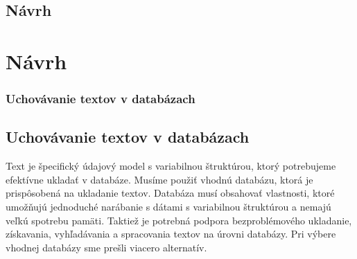 \newpage
%
%
{
	\section{Návrh}
}
{
	\chapter{Návrh}
}
\label{section:design}

%
%
{
	\subsection{Uchovávanie textov v databázach}
}
{
	\section{Uchovávanie textov v databázach}
}
\label{subsection:persisting_texts_in_db}
Text je špecifický údajový model s variabilnou štruktúrou, ktorý potrebujeme efektívne ukladať v databáze. Musíme použiť vhodnú databázu, ktorá je prispôsobená na ukladanie textov. Databáza musí obsahovať vlastnosti, ktoré umožňujú jednoduché narábanie s dátami s variabilnou štruktúrou a nemajú veľkú spotrebu pamäti. Taktiež je potrebná podpora bezproblémového ukladanie, získavania, vyhľadávania a spracovania textov na úrovni databázy. Pri výbere vhodnej databázy sme prešli viacero alternatív.

